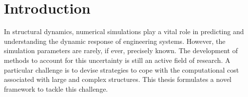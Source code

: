 %
%

\chapter{Introduction}
\label{ch: introduction}

In structural dynamics, numerical simulations play a vital role in predicting and understanding the dynamic response of engineering systems.
However, the simulation parameters are rarely, if ever, precisely known.
The development of methods to account for this uncertainty is still an active field of research.
A particular challenge is to devise strategies to cope with the computational cost associated with large and complex structures.
This thesis formulates a novel framework to tackle this challenge.






